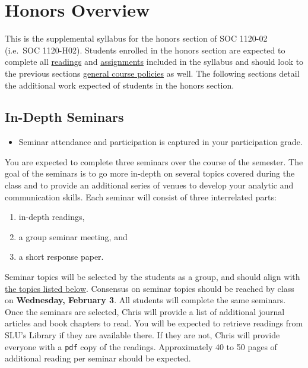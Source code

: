 \documentclass[
]{book}
\providecommand{\tightlist}{%
  \setlength{\itemsep}{0pt}\setlength{\parskip}{0pt}}
\newenvironment{rmdblock}[1]
  {\begin{shaded*}
  \begin{itemize}
  \renewcommand{\labelitemi}{
    \raisebox{-.7\height}[0pt][0pt]{
      {\setkeys{Gin}{width=3em,keepaspectratio}\texttt{[image: images/\#1]}}
    }
  }
  \item
  }
  {
  \end{itemize}
  \end{shaded*}
  }
\newenvironment{rmdtip}
  {\begin{rmdblock}{tip}}
  {\end{rmdblock}}
\begin{document}
\hypertarget{honors-overview}{%
\chapter{Honors Overview}\label{honors-overview}}

This is the supplemental syllabus for the honors section of SOC 1120-02 (i.e.~SOC 1120-H02). Students enrolled in the honors section are expected to complete all \href{/lecture-schedule.html}{readings} and \href{/assignments-and-grading.html}{assignments} included in the syllabus and should look to the previous sections \href{/course-policies.html}{general course policies} as well. The following sections detail the additional work expected of students in the honors section.

\hypertarget{in-depth-seminars}{%
\section{In-Depth Seminars}\label{in-depth-seminars}}

\begin{rmdtip}
Seminar attendance and participation is captured in your participation
grade.
\end{rmdtip}

You are expected to complete three seminars over the course of the semester. The goal of the seminars is to go more in-depth on several topics covered during the class and to provide an additional series of venues to develop your analytic and communication skills. Each seminar will consist of three interrelated parts:

\begin{enumerate}
\def\labelenumi{\arabic{enumi}.}
\tightlist
\item
  in-depth readings,
\item
  a group seminar meeting, and
\item
  a short response paper.
\end{enumerate}

Seminar topics will be selected by the students as a group, and should align with \href{/honors-seminar-topics.html}{the topics listed below}. Consensus on seminar topics should be reached by class on \textbf{Wednesday, February 3}. All students will complete the same seminars. Once the seminars are selected, Chris will provide a list of additional journal articles and book chapters to read. You will be expected to retrieve readings from SLU's Library if they are available there. If they are not, Chris will provide everyone with a \texttt{pdf} copy of the readings. Approximately 40 to 50 pages of additional reading per seminar should be expected.
\end{document}
